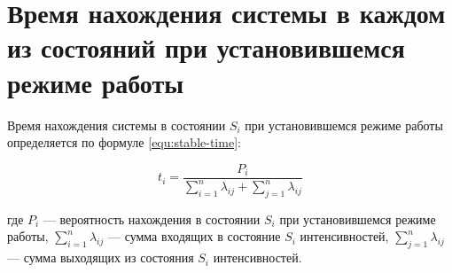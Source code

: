 \chapter{Время нахождения системы в каждом из состояний при установившемся режиме работы}

Время нахождения системы в состоянии $S_i$ при установившемся режиме работы определяется по формуле \ref{equ:stable-time}:

\begin{equation}
	\label{equ:stable-time}
	t_i = \frac{P_i}{ \sum_{i=1}^{n} \lambda_{ij} + \sum_{j=1}^{n} \lambda_{ij}}
\end{equation}

где $P_i$ --- вероятность нахождения в состоянии $S_i$ при установившемся режиме работы,
$\sum_{i=1}^{n} \lambda_{ij}$ --- сумма входящих в состояние $S_i$ интенсивностей, 
$\sum_{j=1}^{n} \lambda_{ij}$ --- сумма выходящих из состояния $S_i$ интенсивностей.